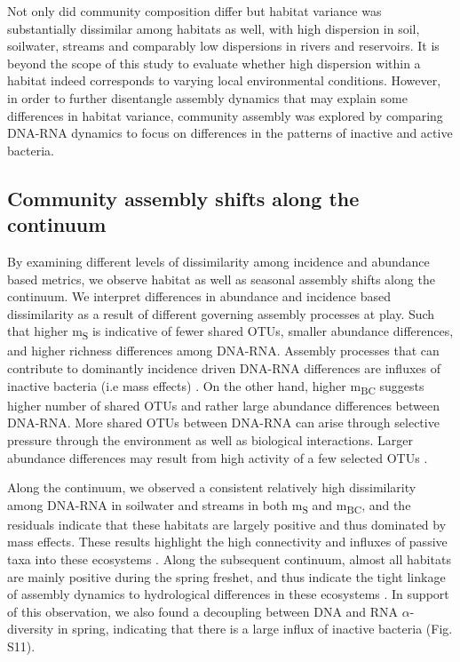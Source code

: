 \documentclass[12pt,a4paper]{article} %
\begin{document}
Not only did community composition differ but habitat variance was substantially dissimilar among habitats as well, with high dispersion in soil, soilwater, streams and comparably low dispersions in rivers and reservoirs. It is beyond the scope of this study to evaluate whether high dispersion within a habitat indeed corresponds to varying local environmental conditions. However, in order to further disentangle assembly dynamics that may explain some differences in habitat variance, community assembly was explored by comparing DNA-RNA dynamics to focus on differences in the patterns of inactive and active bacteria.

\subsection*{Community assembly shifts along the continuum}
By examining different levels of dissimilarity among incidence and abundance based metrics, we observe habitat as well as seasonal assembly shifts along the continuum. We interpret differences in abundance and incidence based dissimilarity as a result of different governing assembly processes at play. Such that higher m\textsubscript{S} is indicative of fewer shared OTUs, smaller abundance differences, and higher richness differences among DNA-RNA. Assembly processes that can contribute to dominantly incidence driven DNA-RNA differences are influxes of inactive bacteria (i.e mass effects) \citep{Leibold2004a}. On the other hand, higher m\textsubscript{BC} suggests higher number of shared OTUs and rather large abundance differences between DNA-RNA. More shared OTUs between DNA-RNA can arise through selective pressure through the environment as well as biological interactions. Larger abundance differences may result from high activity of a few selected OTUs \citep{Campbell2013}.

Along the continuum, we observed a consistent relatively high dissimilarity among DNA-RNA in soilwater and streams in both m\textsubscript{S} and m\textsubscript{BC}, and the residuals indicate that these habitats are largely positive and thus dominated by mass effects. These results highlight the high connectivity and influxes of passive taxa into these ecosystems \citep{Ruiz-Gonzalez2015, Hauptmann2016, Crump2012}. Along the subsequent continuum, almost all habitats are mainly positive during the spring freshet, and thus indicate the tight linkage of assembly dynamics to hydrological differences in these ecosystems \citep{Nino-Garcia2016, Read2015}. In support of this observation, we also found a decoupling between DNA and RNA $\alpha$-diversity in spring, indicating that there is a large influx of inactive bacteria (Fig. S11).
\end{document}
